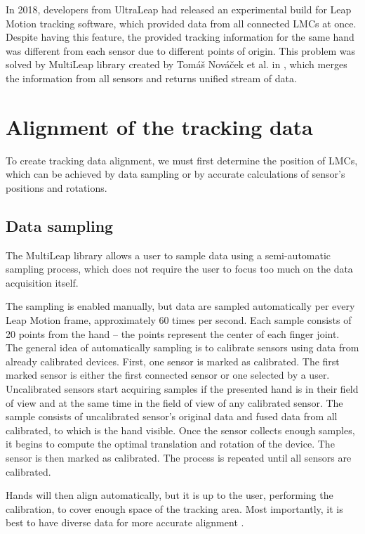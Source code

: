 
In 2018, developers from UltraLeap had released an experimental build for Leap Motion tracking software, which provided data from all connected LMCs at once. Despite having this feature, the provided tracking information for the same hand was different from each sensor due to different points of origin. This problem was solved by MultiLeap library created by Tomáš Nováček et al. in \cite{tomasMultileap}, which merges the information from all sensors and returns unified stream of data. 

\section{Alignment of the tracking data}

To create tracking data alignment, we must first determine the position of LMCs, which can be achieved by data sampling or by accurate calculations of sensor's positions and rotations.

\subsection{Data sampling}

The MultiLeap library allows a user to sample data using a semi-automatic sampling process, which does not require the user to focus too much on the data acquisition itself.

The sampling is enabled manually, but data are sampled automatically per every Leap Motion frame, approximately 60 times per second. Each sample consists of 20 points from the hand – the points represent the center of each finger joint. 
The general idea of automatically sampling is to calibrate sensors using data from already calibrated devices. First, one sensor is marked as calibrated. The first marked sensor is either the first connected sensor or one selected by a user. Uncalibrated sensors start acquiring samples if the presented hand is in their field of view and at the same time in the field of view of any calibrated sensor. The sample consists of uncalibrated sensor's original data and fused data from all calibrated, to which is the hand visible. Once the sensor collects enough samples, it begins to compute the optimal translation and rotation of the device. The sensor is then marked as calibrated. The process is repeated until all sensors are calibrated. \cite{tomasMultileap}


Hands will then align automatically, but it is up to the user, performing the calibration, to cover enough space of the tracking area. Most importantly, it is best to have diverse data for more accurate alignment \cite{tomasMultileap}.

